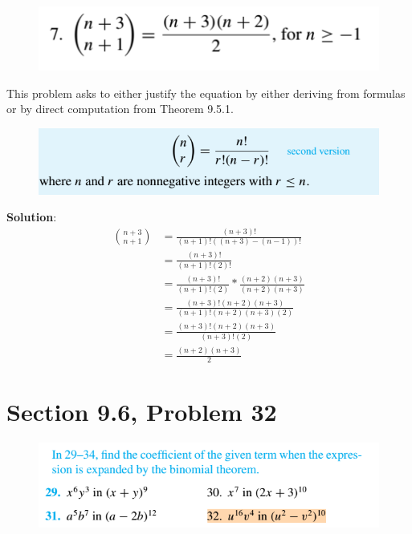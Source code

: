 \documentclass{article}
\begin{document}
\begin{large}
\begin{figure}[h]
\includegraphics[scale = 1]{HW2Prob5}
\centering
\end{figure}

This problem asks to either justify the equation by either deriving from formulas or by direct computation from Theorem 9.5.1. 

\begin{figure}[h]
\includegraphics[scale = 1]{HW2Prob5-a}
\centering
\end{figure}

\textbf{Solution}:
\begingroup
\addtolength{\jot}{1em}
\begin{align*}
    \binom{n+3}{n+1} &= \frac{(n+3)!}{(n+1)!((n+3)-(n-1))!} \\
                     &= \frac{(n+3)!}{(n+1)!(2)!} \\
                     &= \frac{(n+3)!}{(n+1)!(2)} * \frac{(n+2)(n+3)}{(n+2)(n+3)} \\
                     &= \frac{(n+3)!(n+2)(n+3)}{(n+1)!(n+2)(n+3)(2)} \\
                     &= \frac{(n+3)!(n+2)(n+3)}{(n+3)!(2)} \\
                     &= \frac{(n+2)(n+3)}{2}
\end{align*}
\endgroup

\clearpage
\header

\section*{Section 9.6, Problem 32}

\begin{figure}[h]
\includegraphics[scale = 1]{HW2Prob6}
\centering
\end{figure}


\end{large}
\end{document}
